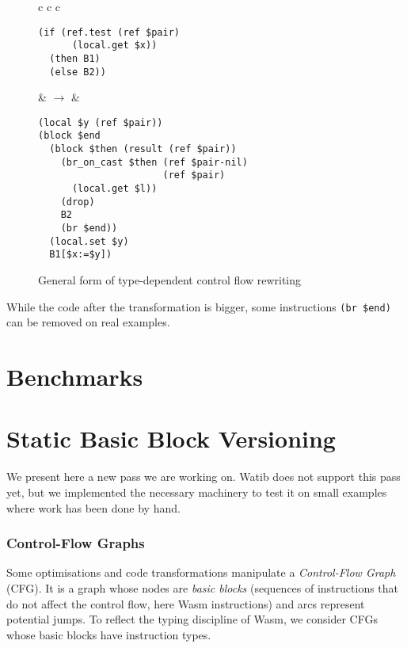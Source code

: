 \documentclass[a4paper,11pt]{article}
\begin{document}
\begin{figure}[h]
  \centering
  \begin{tabular}{c c c}
    \begin{minipage}{\widthof{\texttt{(if (ref.test (ref \$pair)}}}
\begin{verbatim}
(if (ref.test (ref $pair)
      (local.get $x))
  (then B1)
  (else B2))
\end{verbatim}
\end{minipage}
    &
    $\rightarrow$
    &
\begin{minipage}{\widthof{\texttt{....(br\_on\_cast \$then (ref \$pair-nil)}}}
\begin{verbatim}
(local $y (ref $pair))
(block $end
  (block $then (result (ref $pair))
    (br_on_cast $then (ref $pair-nil)
                      (ref $pair)
      (local.get $l))
    (drop)
    B2
    (br $end))
  (local.set $y)
  B1[$x:=$y])
\end{verbatim}
\end{minipage}
  \end{tabular}
  \caption{General form of type-dependent control flow rewriting}\label{br}
\end{figure}

While the code after the transformation is bigger, some instructions \texttt{(br
  \$end)} can be removed on real examples.

\section{Benchmarks}\label{bench}
\section{Static Basic Block Versioning}
We present here a new pass we are working on. \textsf{Watib} does not support
this pass yet, but we implemented the necessary machinery to test it on small
examples where work has been done by hand.
\subsubsection{Control-Flow Graphs}\label{cfg}
Some optimisations and code transformations manipulate a \emph{Control-Flow
Graph} (CFG). It is a graph whose nodes are \emph{basic blocks} (sequences of
instructions that do not affect the control flow, here Wasm instructions) and
arcs represent potential jumps. To reflect the typing discipline of Wasm, we
consider CFGs whose basic blocks have instruction types.
\end{document}
